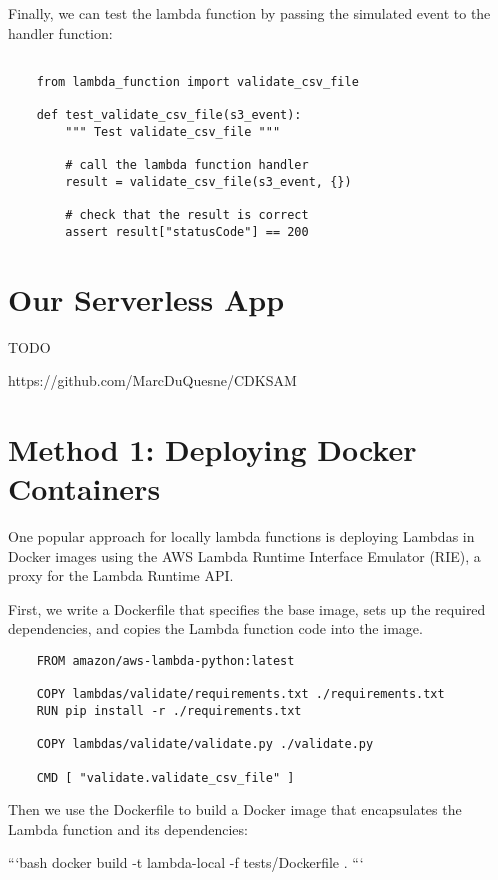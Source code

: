 \documentclass{article}
\begin{document}
Finally, we can test the lambda function by passing the simulated event to the handler function:

\begin{verbatim}

    from lambda_function import validate_csv_file

    def test_validate_csv_file(s3_event):
        """ Test validate_csv_file """

        # call the lambda function handler
        result = validate_csv_file(s3_event, {})

        # check that the result is correct
        assert result["statusCode"] == 200

\end{verbatim}

\section{Our Serverless App}

TODO

https://github.com/MarcDuQuesne/CDKSAM

\section{Method 1: Deploying Docker Containers}

One popular approach for locally lambda functions is deploying Lambdas in Docker images using
the AWS Lambda Runtime Interface Emulator (RIE), a proxy for the Lambda Runtime API.

First, we write a Dockerfile that specifies the base image, sets up the required dependencies, and copies the Lambda function code into the image.

\begin{verbatim}
    FROM amazon/aws-lambda-python:latest

    COPY lambdas/validate/requirements.txt ./requirements.txt
    RUN pip install -r ./requirements.txt

    COPY lambdas/validate/validate.py ./validate.py

    CMD [ "validate.validate_csv_file" ]

\end{verbatim}

Then we use the Dockerfile to build a Docker image that encapsulates the Lambda function and its dependencies:

```bash
docker build -t lambda-local -f tests/Dockerfile .
```
\end{document}
